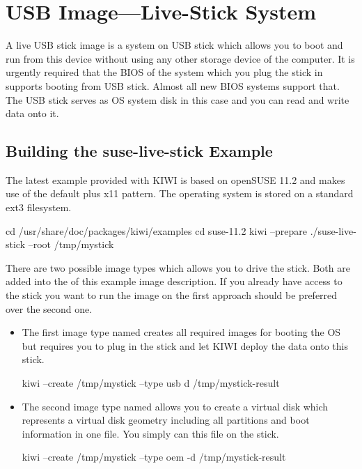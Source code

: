 \chapter{USB Image---Live-Stick System}
\label{chapter:usb}
\minitoc

A live USB stick image is a system on USB stick which allows you to
boot and run from this device without using any other storage device of
the computer. It is urgently required that the BIOS of the system which
you plug the stick in supports booting from USB stick. Almost all
new BIOS systems support that. The USB stick serves as OS system disk
in this case and you can read and write data onto it.

\section{Building the suse-live-stick Example}

The latest example provided with KIWI is based on openSUSE 11.2 and makes use
of the default plus x11 pattern. The operating system is stored on a
standard ext3 filesystem. 

\begin{Command}{12cm}
cd /usr/share/doc/packages/kiwi/examples
cd suse-11.2
kiwi --prepare ./suse-live-stick --root /tmp/mystick
\end{Command}

There are two possible image types which allows you to drive the
stick. Both are added into the %
 of this example image
description. If you already have access to the stick you want to
run the image on the first approach should be preferred over the
second one.

\begin{itemize}
\item The first image type named  creates all required
      images for booting the OS but requires you to plug in the stick
      and let KIWI deploy the data onto this stick.

\begin{Command}{12cm}
kiwi --create /tmp/mystick --type usb d /tmp/mystick-result
\end{Command}

\item The second image type named  allows you to create a
      virtual disk which represents a virtual disk geometry including
      all partitions and boot information in one file. You simply can 
      this file on the stick.

\begin{Command}{12cm}
kiwi --create /tmp/mystick --type oem -d /tmp/mystick-result
\end{Command}
\end{itemize}

